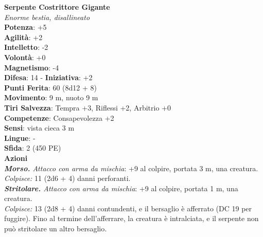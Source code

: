 \begin{multicols}{2}
\medskip\textbf{Serpente Costrittore Gigante}\\
\emph{Enorme bestia, disallineato}\\
\textbf{Potenza}: +5\\
\textbf{Agilità}: +2\\
\textbf{Intelletto}: -2\\
\textbf{Volontà}: +0\\
\textbf{Magnetismo}: -4\\
\textbf{Difesa}: 14 - \textbf{Iniziativa}: +2\\
\textbf{Punti Ferita}: 60 (8d12 + 8)\\
\textbf{Movimento}: 9 m, nuoto 9 m\\
\textbf{Tiri Salvezza}: Tempra +3, Riflessi +2, Arbitrio +0\\
\textbf{Competenze}: Consapevolezza +2\\
\textbf{Sensi}: vista cieca 3 m\\
\textbf{Lingue}: -\\
\textbf{Sfida}: 2 (450 PE)\smallskip\\
\smallskip\textbf{Azioni}\\
\emph{\textbf{Morso.} Attacco con arma da mischia}: +9 al colpire, portata 3 m, una creatura.\\
\emph{Colpisce:} 11 (2d6 + 4) danni perforanti.\\
\emph{\textbf{Stritolare.} Attacco con arma da mischia}: +9 al colpire, portata 1 m, una creatura.\\
\emph{Colpisce:} 13 (2d8 + 4) danni contundenti, e il bersaglio è afferrato (DC  19 per fuggire). Fino al termine dell'afferrare, la creatura è intralciata, e il serpente non può stritolare un altro bersaglio.\\



\end{multicols}
